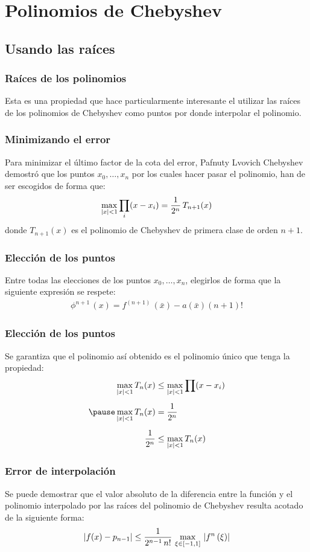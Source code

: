 \documentclass[12pt]{beamer}
\begin{document}
\section{Polinomios de Chebyshev}
\subsection{Usando las raíces}

\begin{frame}
\frametitle{Raíces de los polinomios}
Esta es una propiedad que hace particularmente interesante el utilizar las raíces de los polinomios de Chebyshev como puntos por donde interpolar el polinomio.
\end{frame}
\begin{frame}
\frametitle{Minimizando el error}
Para minimizar el último factor de la cota del error, Pafnuty Lvovich Chebyshev demostró que los puntos $x_{0}, \ldots, x_{n}$ por los cuales hacer pasar el polinomio, han de ser escogidos de forma que:
\pause
\begin{align*}
\max_{\abs{x}<1} \prod_{i} (x - x_{i}) = \dfrac{1}{2^{n}} \, T_{n+1} (x)
\end{align*}
donde $T_{n+1}(x)$ es el polinomio de Chebyshev de primera clase de orden $n + 1$.
\end{frame}
\begin{frame}
\frametitle{Elección de los puntos}
Entre todas las elecciones de los puntos $x_{0}, \ldots, x_{n}$, elegirlos de forma que la siguiente expresión se respete:
\pause
\begin{align*}
\phi^{n+1} \, (x) = f^{(n+1)} \, (\bar{x}) - a (\bar{x}) (n + 1)!
\end{align*}
\end{frame}
\begin{frame}
\frametitle{Elección de los puntos}
Se garantiza que el polinomio así obtenido es el polinomio único que tenga la propiedad:
\pause
\begin{eqnarray*}
\begin{aligned}
\max_{\abs{x}<1} T_{n} (x) &\leq \max_{\abs{x}<1} \prod (x - x_{i}) \\[0.5em] \pause
\max_{\abs{x}<1} T_{n} (x) &= \dfrac{1}{2^{n}} \\[0.5em]
\dfrac{1}{2^{n}} &\leq \max_{\abs{x}<1} T_{n} (x)
\end{aligned}
\end{eqnarray*}
\end{frame}
\begin{frame}
\frametitle{Error de interpolación}
Se puede demostrar que el valor absoluto de la diferencia entre la función y el polinomio interpolado por las raíces del polinomio de Chebyshev resulta acotado de la siguiente forma:
\pause
\begin{align*}
\abs{f(x) - p_{n-1}} \leq \dfrac{1}{2^{n-1} \, n!} \, \max_{\xi \in [-1, 1]}  \, \abs{f^{n} \, (\xi)}
\end{align*}
\end{frame}
\end{document}
